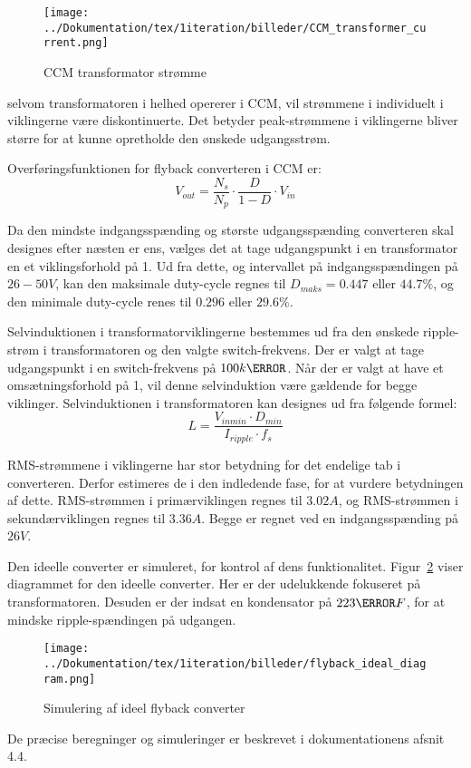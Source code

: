 \begin{figure}[H]
	\centering
	\texttt{[image: ../Dokumentation/tex/1iteration/billeder/CCM\_transformer\_current.png]}
	\caption{CCM transformator strømme}
	\label{fig:flyabck_ideal_currents}
\end{figure}

selvom transformatoren i helhed opererer i CCM, vil strømmene i individuelt i viklingerne være diskontinuerte. Det betyder peak-strømmene i viklingerne bliver større for at kunne opretholde den ønskede udgangsstrøm. 

\noindent Overføringsfunktionen for flyback converteren i CCM er\cite{SMPS-topologies2}:
\begin{equation*}
	V_{out} = \frac{N_s}{N_p} \cdot \frac{D}{1-D} \cdot V_{in}
\end{equation*}

Da den mindste indgangsspænding og største udgangsspænding converteren skal designes efter næsten er ens, vælges det at tage udgangspunkt i en transformator en et viklingsforhold på 1. Ud fra dette, og intervallet på indgangsspændingen på $26-50V$, kan den maksimale duty-cycle regnes til $D_{maks} = 0.447$ eller $44.7\percent$, og den minimale duty-cycle renes til $0.296$ eller $29.6\percent$.  

Selvinduktionen i transformatorviklingerne bestemmes ud fra den ønskede ripple-strøm i transformatoren og den valgte switch-frekvens. Der er valgt at tage udgangspunkt i en switch-frekvens på $100k\hertz$. Når der er valgt at have et omsætningsforhold på 1, vil denne selvinduktion være gældende for begge viklinger. Selvinduktionen i transformatoren kan designes ud fra følgende formel\cite{flyback-formler}:
\begin{equation*}
	L = \frac{V_{inmin} \cdot D_{min}}{I_{ripple} \cdot f_s}
\end{equation*}

RMS-strømmene i viklingerne har stor betydning for det endelige tab i converteren. Derfor estimeres de i den indledende fase, for at vurdere betydningen af dette. RMS-strømmen i primærviklingen regnes til $3.02A$, og RMS-strømmen i sekundærviklingen regnes til $3.36A$. Begge er regnet ved en indgangsspænding på $26V$. 

Den ideelle converter er simuleret, for kontrol af dens funktionalitet. Figur~\ref{fig:flyabck_ideal_diagram} viser diagrammet for den ideelle converter. Her er der udelukkende fokuseret på transformatoren. Desuden er der indsat en kondensator på $223\micro F$, for at mindske ripple-spændingen på udgangen. 

\begin{figure}[H]
	\centering
	\texttt{[image: ../Dokumentation/tex/1iteration/billeder/flyback\_ideal\_diagram.png]}
	\caption{Simulering af ideel flyback converter}
	\label{fig:flyabck_ideal_diagram}
\end{figure}

\noindent De præcise beregninger og simuleringer er beskrevet i dokumentationens afsnit 4.4.






